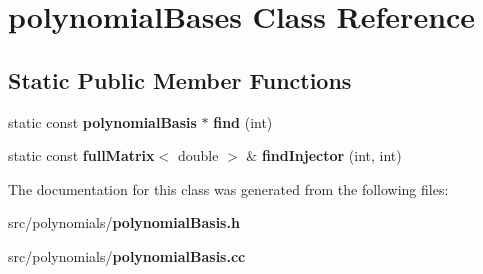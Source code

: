 \section{polynomial\-Bases Class Reference}
\label{classpolynomialBases}
\subsection*{Static Public Member Functions}
\begin{DoxyCompactItemize}
\item 
static const {\bf polynomial\-Basis} $\ast$ {\bfseries find} (int)\label{classpolynomialBases_a8f0f3eaf6f26ccd2cf392b942c3f71d0}

\item 
static const {\bf full\-Matrix}$<$ double $>$ \& {\bfseries find\-Injector} (int, int)\label{classpolynomialBases_a6a3e7695d46b1d222405e8a89a0fe0ce}

\end{DoxyCompactItemize}


The documentation for this class was generated from the following files\-:\begin{DoxyCompactItemize}
\item 
src/polynomials/{\bf polynomial\-Basis.\-h}\item 
src/polynomials/{\bf polynomial\-Basis.\-cc}\end{DoxyCompactItemize}
